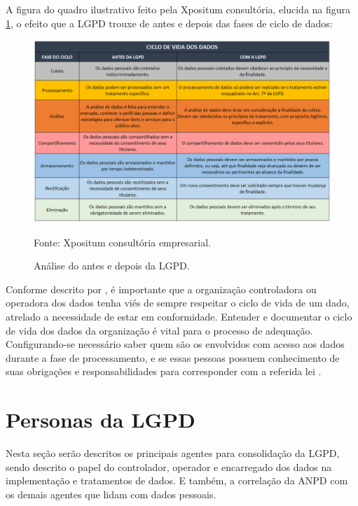 \documentclass[
	12pt,				%
	openright,			%
	oneside,			%
	a4paper,			%
	english,			%
	french,				%
	spanish,			%
	brazil,				%
	]{abntex2}
\begin{document}
A figura do quadro ilustrativo feito pela Xpositum consultória, elucida na figura \ref{fig: 02CicloDeVida}, o efeito que a LGPD trouxe de antes e depois das fases de ciclo de dados:
\begin{figure}[ht]
    \centering
    \caption{Análise do antes e depois da LGPD.}
    \includegraphics[width=6.2in]{Images/02CicloDeVida.png}
    \label{fig: 02CicloDeVida}
    
     \centering \small Fonte: Xpositum consultória empresarial.
    
\end{figure}

Conforme descrito por , é importante que a organização controladora ou operadora dos dados tenha viés de sempre respeitar o ciclo de vida de um dado, atrelado a necessidade de estar em conformidade. Entender e documentar o ciclo de vida dos dados da organização é vital para o processo de adequação. Configurando-se necessário saber quem são os envolvidos com acesso aos dados durante a fase de processamento, e se essas pessoas possuem conhecimento de suas obrigações e responsabilidades para corresponder com a referida lei \cite{Donda2020}.


\section{Personas da LGPD}
\label{sec: exemplo2}
Nesta seção serão descritos os principais agentes para consolidação da LGPD, sendo descrito o papel do controlador, operador e encarregado dos dados na implementação e tratamentos de dados. E também, a correlação da ANPD com os demais agentes que lidam com dados pessoais. 
\end{document}
